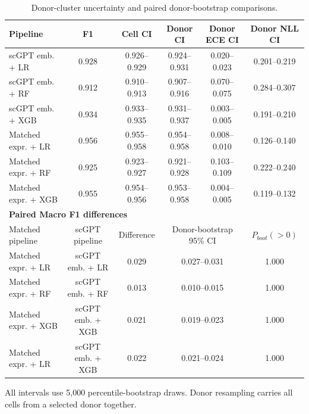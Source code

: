 \begin{table}[p]\centering\scriptsize
\caption{Donor-cluster uncertainty and paired donor-bootstrap comparisons.}\label{tab:s4}
\begin{threeparttable}\begin{tabular}{lccccc}
\toprule Pipeline & F1 & Cell CI & Donor CI & Donor ECE CI & Donor NLL CI \\\midrule
scGPT emb. + LR & 0.928 & 0.926--0.929 & 0.924--0.931 & 0.020--0.023 & 0.201--0.219 \\
scGPT emb. + RF & 0.912 & 0.910--0.913 & 0.907--0.916 & 0.070--0.075 & 0.284--0.307 \\
scGPT emb. + XGB & 0.934 & 0.933--0.935 & 0.931--0.937 & 0.003--0.005 & 0.191--0.210 \\
Matched expr. + LR & 0.956 & 0.955--0.958 & 0.954--0.958 & 0.008--0.010 & 0.126--0.140 \\
Matched expr. + RF & 0.925 & 0.923--0.927 & 0.921--0.928 & 0.103--0.109 & 0.222--0.240 \\
Matched expr. + XGB & 0.955 & 0.954--0.956 & 0.953--0.958 & 0.004--0.005 & 0.119--0.132 \\
\midrule
\multicolumn{6}{l}{\textbf{Paired Macro F1 differences}}\\
Matched pipeline & scGPT pipeline & Difference & \multicolumn{2}{c}{Donor-bootstrap 95\% CI} & $P_{boot}(>0)$ \\\midrule
Matched expr. + LR & scGPT emb. + LR & 0.029 & \multicolumn{2}{c}{0.027--0.031} & 1.000 \\
Matched expr. + RF & scGPT emb. + RF & 0.013 & \multicolumn{2}{c}{0.010--0.015} & 1.000 \\
Matched expr. + XGB & scGPT emb. + XGB & 0.021 & \multicolumn{2}{c}{0.019--0.023} & 1.000 \\
Matched expr. + LR & scGPT emb. + XGB & 0.022 & \multicolumn{2}{c}{0.021--0.024} & 1.000 \\
\bottomrule\end{tabular}\begin{tablenotes}[flushleft]\footnotesize\item All intervals use 5,000 percentile-bootstrap draws. Donor resampling carries all cells from a selected donor together.\end{tablenotes}\end{threeparttable}\end{table}
